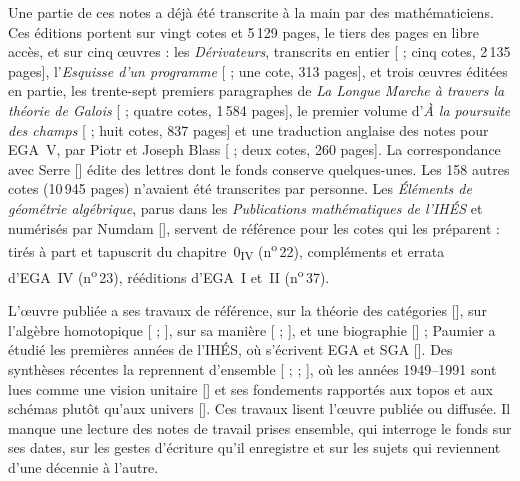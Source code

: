 \documentclass[11pt]{amsart}
\newcommand{\cote}[1]{\mbox{n\textsuperscript{o}\,#1}}
\begin{document}
Une partie de ces notes a déjà été transcrite à la main par des mathématiciens. Ces éditions portent sur vingt cotes et 5\,129 pages, le tiers des pages en libre accès, et sur cinq œuvres : les \emph{Dérivateurs}, transcrits en entier [\citealp{kmm} ; cinq cotes, 2\,135 pages], l'\emph{Esquisse d'un programme} [\citealp{grothendieck1997} ; une cote, 313 pages], et trois œuvres éditées en partie, les trente-sept premiers paragraphes de \emph{La Longue Marche à travers la théorie de Galois} [\citealp{grothendieck1995} ; quatre cotes, 1\,584 pages], le premier volume d'\emph{À la poursuite des champs} [\citealp{maltsiniotis2022} ; huit cotes, 837 pages] et une traduction anglaise des notes pour EGA~V, par Piotr et Joseph Blass [\citealp{circle-pub} ; deux cotes, 260 pages]. La correspondance avec Serre [\citealp{colmez2001}] édite des lettres dont le fonds conserve quelques-unes. Les 158 autres cotes (10\,945 pages) n'avaient été transcrites par personne. Les \emph{Éléments de géométrie algébrique}, parus dans les \emph{Publications mathématiques de l'IHÉS} et numérisés par Numdam [\citealp{ega}], servent de référence pour les cotes qui les préparent : tirés à part et tapuscrit du chapitre~0\textsubscript{IV} (\cote{22}), compléments et errata d'EGA~IV (\cote{23}), rééditions d'EGA~I et~II (\cote{37}).

L'œuvre publiée a ses travaux de référence, sur la théorie des catégories [\citealp{kromer2006,kromer2007}], sur l'algèbre homotopique [\citealp{maltsiniotis2005} ; \citealp{cisinski2006}], sur sa manière [\citealp{mclarty2007} ; \citealp{cartier2001}], et une biographie [\citealp{jackson2004}] ; Paumier a étudié les premières années de l'IHÉS, où s'écrivent EGA et SGA [\citealp{paumier2015}]. Des synthèses récentes la reprennent d'ensemble [\citealp{zalamea2024} ; \citealp{cruzmorales2024} ; \citealp{panza2025}], où les années 1949--1991 sont lues comme une vision unitaire [\citealp{zalamea2025}] et ses fondements rapportés aux topos et aux schémas plutôt qu'aux univers [\citealp{mclarty2025}]. Ces travaux lisent l'œuvre publiée ou diffusée. Il manque une lecture des notes de travail prises ensemble, qui interroge le fonds sur ses dates, sur les gestes d'écriture qu'il enregistre et sur les sujets qui reviennent d'une décennie à l'autre.
\end{document}
